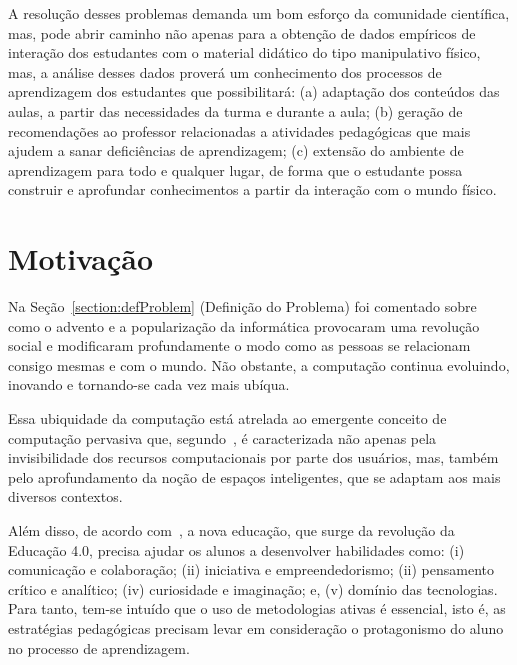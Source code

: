 A resolução desses problemas demanda um bom esforço da comunidade científica, mas, pode abrir caminho não apenas para a obtenção de dados empíricos de interação dos estudantes com o material didático do tipo manipulativo físico, mas, a análise desses dados proverá um conhecimento dos processos de aprendizagem dos estudantes que possibilitará: (a) adaptação dos conteúdos das aulas, a partir das necessidades da turma e durante a aula; (b) geração de recomendações ao professor relacionadas a atividades pedagógicas que mais ajudem a sanar deficiências de aprendizagem; (c) extensão do ambiente de aprendizagem para todo e qualquer lugar, de forma que o estudante possa construir e aprofundar conhecimentos a partir da interação com o mundo físico.


\section{Motivação}
\label{section:motivation}


Na Seção~\ref{section:defProblem} (Definição do Problema) foi comentado sobre como o advento e a popularização da informática provocaram uma revolução social e modificaram profundamente o modo como as pessoas se relacionam consigo mesmas e com o mundo. Não obstante, a computação  continua evoluindo, inovando e tornando-se cada vez mais ubíqua.

Essa ubiquidade da computação está atrelada ao emergente conceito de computação pervasiva que, segundo~\cite{Satyanarayanan:2001}, é caracterizada não apenas pela invisibilidade dos recursos computacionais por parte dos usuários, mas, também pelo aprofundamento da noção de espaços inteligentes, que se adaptam aos mais diversos contextos.

Além disso, de acordo com~\cite{Caron:2018}, a nova educação, que surge da revolução da Educação 4.0, precisa ajudar os alunos a desenvolver habilidades como: (i) comunicação e colaboração; (ii) iniciativa e empreendedorismo; (ii) pensamento crítico e analítico; (iv) curiosidade e imaginação; e, (v) domínio das tecnologias. Para tanto, tem-se intuído que o uso de metodologias ativas é essencial, isto é, as estratégias pedagógicas precisam levar em consideração o protagonismo do aluno no processo de aprendizagem.


